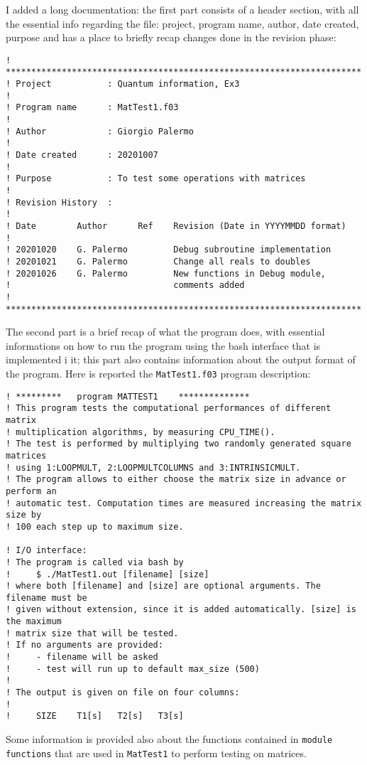 \documentclass[a4paper]{article}
\begin{document}
\noindent I added a long documentation: the first part consists of a header section, with all the essential info regarding the file: project, program name, author, date created, purpose and has a place to briefly recap changes done in the revision phase:
\begin{verbatim}
! **********************************************************************
! Project           : Quantum information, Ex3
! 
! Program name      : MatTest1.f03
! 
! Author            : Giorgio Palermo
! 
! Date created      : 20201007
! 
! Purpose           : To test some operations with matrices
! 
! Revision History  :
!
! Date        Author      Ref    Revision (Date in YYYYMMDD format) 
!
! 20201020    G. Palermo         Debug subroutine implementation
! 20201021    G. Palermo         Change all reals to doubles
! 20201026    G. Palermo         New functions in Debug module,
!                                comments added
! **********************************************************************
\end{verbatim}
The second part is a brief recap of what the program does, with essential informations on how to run the program using the bash interface that is implemented i it; this part also contains information about the output format of the program.
Here is reported the \lstinline{MatTest1.f03} program description:
\begin{verbatim}
! *********   program MATTEST1    **************
! This program tests the computational performances of different matrix
! multiplication algorithms, by measuring CPU_TIME().
! The test is performed by multiplying two randomly generated square matrices
! using 1:LOOPMULT, 2:LOOPMULTCOLUMNS and 3:INTRINSICMULT.
! The program allows to either choose the matrix size in advance or perform an 
! automatic test. Computation times are measured increasing the matrix size by
! 100 each step up to maximum size.

! I/O interface:
! The program is called via bash by 
!     $ ./MatTest1.out [filename] [size]
! where both [filename] and [size] are optional arguments. The filename must be
! given without extension, since it is added automatically. [size] is the maximum
! matrix size that will be tested.
! If no arguments are provided:
!     - filename will be asked
!     - test will run up to default max_size (500)
! 
! The output is given on file on four columns:
! 
!     SIZE    T1[s]   T2[s]   T3[s]
\end{verbatim}
Some information is provided also about the functions contained in \lstinline{module functions} that are used in \lstinline{MatTest1} to perform testing on matrices.
\end{document}
